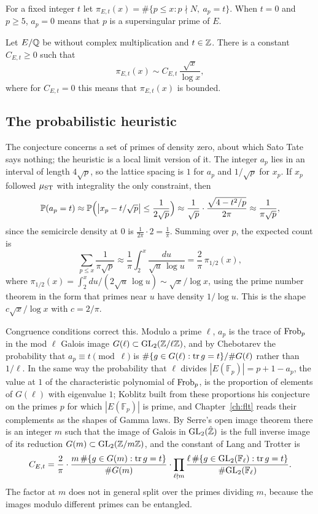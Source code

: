 For a fixed integer $t$ let $\pi_{E,t}(x) = \#\{p\le x: p\nmid N,\ a_p = t\}$. When $t = 0$ and $p\ge5$, $a_p = 0$ means that $p$ is a supersingular prime of $E$.

\begin{conjecture}
Let $E/\mathbb{Q}$ be without complex multiplication and $t\in\mathbb{Z}$. There is a constant $C_{E,t}\ge0$ such that
\[
\pi_{E,t}(x) \sim C_{E,t}\,\frac{\sqrt x}{\log x},
\]
where for $C_{E,t} = 0$ this means that $\pi_{E,t}(x)$ is bounded.
\end{conjecture}

\subsection{The probabilistic heuristic}

The conjecture concerns a set of primes of density zero, about which Sato Tate says nothing; the heuristic is a local limit version of it. The integer $a_p$ lies in an interval of length $4\sqrt p$, so the lattice spacing is $1$ for $a_p$ and $1/\sqrt p$ for $x_p$. If $x_p$ followed $\mu_{\mathrm{ST}}$ with integrality the only constraint, then
\[
\mathbb{P}(a_p = t) \approx \mathbb{P}\Bigl(\bigl|x_p - t/\sqrt p\bigr| \le \frac{1}{2\sqrt p}\Bigr) \approx \frac{1}{\sqrt p}\cdot\frac{\sqrt{4 - t^2/p}}{2\pi}\approx \frac{1}{\pi\sqrt p},
\]
since the semicircle density at $0$ is $\frac{1}{2\pi}\cdot2 = \frac1\pi$. Summing over $p$, the expected count is
\[
\sum_{p\le x}\frac{1}{\pi\sqrt p}\approx\frac1\pi\int_2^x\frac{du}{\sqrt u\,\log u} = \frac2\pi\,\pi_{1/2}(x),
\]
where $\pi_{1/2}(x) = \int_2^x du/(2\sqrt u\,\log u)\sim\sqrt x/\log x$, using the prime number theorem in the form that primes near $u$ have density $1/\log u$. This is the shape $c\sqrt x/\log x$ with $c = 2/\pi$.

Congruence conditions correct this. Modulo a prime $\ell$, $a_p$ is the trace of $\operatorname{Frob}_p$ in the mod $\ell$ Galois image $G(\ell)\subset\mathrm{GL}_2(\mathbb{Z}/\ell\mathbb{Z})$, and by Chebotarev \cite{chebotarev1926} the probability that $a_p\equiv t\pmod\ell$ is $\#\{g\in G(\ell):\operatorname{tr} g = t\}/\#G(\ell)$ rather than $1/\ell$. In the same way the probability that $\ell$ divides $|E(\mathbb F_p)|=p+1-a_p$, the value at $1$ of the characteristic polynomial of $\operatorname{Frob}_p$, is the proportion of elements of $G(\ell)$ with eigenvalue $1$; Koblitz \cite{koblitz1988} built from these proportions his conjecture on the primes $p$ for which $|E(\mathbb F_p)|$ is prime, and Chapter~\ref{ch:flt} reads their complements as the shapes of Gamma laws. By Serre's open image theorem \cite{serre1972} there is an integer $m$ such that the image of Galois in $\mathrm{GL}_2(\hat{\mathbb{Z}})$ is the full inverse image of its reduction $G(m)\subset\mathrm{GL}_2(\mathbb{Z}/m\mathbb{Z})$, and the constant of Lang and Trotter is
\[
C_{E,t} = \frac2\pi\cdot\frac{m\,\#\{g\in G(m):\operatorname{tr} g = t\}}{\#G(m)}\cdot\prod_{\ell\nmid m}\frac{\ell\,\#\{g\in\mathrm{GL}_2(\mathbb{F}_\ell):\operatorname{tr} g = t\}}{\#\mathrm{GL}_2(\mathbb{F}_\ell)}.
\]
The factor at $m$ does not in general split over the primes dividing $m$, because the images modulo different primes can be entangled.

